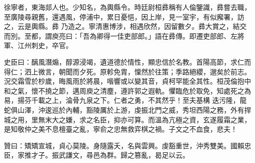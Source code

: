 \begin{pinyinscope}
 徐寧者，東海郯人也。少知名，為輿縣令。時廷尉桓彞稱有人倫鑒識，彞嘗去職，至廣陵尋親舊，還遇風，停浦中，累日憂悒，因上岸，見一室宇，有似廨署，訪之，云是輿縣。彞
 乃造之。寧清惠博涉，相遇欣然，因留數夕。彞大賞之，結交而別。至都，謂庾亮曰：「吾為卿得一佳吏部郎。」語在彞傳。即遷吏部郎、左將軍、江州刺史，卒官。



 史臣曰：醨風潛煽，醇源浸竭，遺道德於情性，顯忠信於名教。首陽高節，求仁而得仁；泗上微言，朝聞而夕死。原軫免胄，懍然於往策；季路絕纓，邈矣於前志。況交霜雪於杪歲，晦風雨於將晨，喈響或以變其音，貞柯罕能全其性。桓茂倫抱中和之氣，懷不撓之節，邁周庾之清塵，遵許郭之遐軌。懼臨危於取免，知處死之為易，揚芬千載之上，淪骨九泉之下。仁者之勇，不其然乎！至夫基構
 迭污隆，龍蛇俱山澤，沖逡巡於內輔，豁陵厲於上游，虔振北門之威，秀坦西陽之務，外有捍城之用，里無末大之嫌，求之名臣，抑亦可算。而溫為亢極之資，玄遂履霜之業，是知敬仲之美不息檀臺之亂，寧俞之忠無救弈棋之禍。子文之不血食，悲夫！



 贊曰：矯矯宣城，貞心莫陵。身隨露夭，名與雲興。虔豁重世，沖秀雙美。國賴忠臣，家推才子。振武謙文，尋邑為群。歸之篡亂，曷足以云。



\end{pinyinscope}